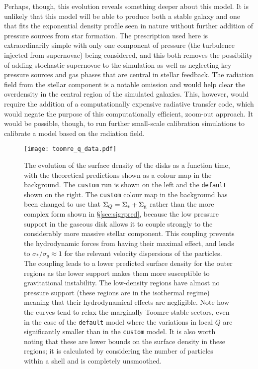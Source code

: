 Perhaps, though, this evolution reveals something deeper about this model.
It is unlikely that this model will be able to produce both a stable galaxy and one that fits the exponential density profile seen in nature without further addition of pressure sources from star formation.
The prescription used here is extraordinarily simple with only one component of pressure (the turbulence injected from supernovae) being considered, and this both removes the possibility of adding stochastic supernovae to the simulation as well as neglecting key pressure sources and gas phases that are central in stellar feedback.
The radiation field from the stellar component is a notable omission and would help clear the overdensity in the central region of the simulated galaxies.
This, however, would require the addition of a computationally expensive radiative transfer code, which would negate the purpose of this computationally efficient, zoom-out approach.
It would be possible, though, to run further small-scale calibration simulations to calibrate a model based on the radiation field.


\begin{figure}
    \centering
    \texttt{[image: toomre\_q\_data.pdf]}
    \caption{The evolution of the surface density of the disks as a function time, with the theoretical predictions shown as a colour map in the background. The {\tt custom} run is shown on the left and the {\tt default} shown on the right. The {\tt custom} colour map in the background has been changed to use that $\Sigma_Q = \Sigma_* + \Sigma_\mathrm{g}$ rather than the more complex form shown in \S \ref{sec:sigrpred}, because the low pressure support in the gaseous disk allows it to couple strongly to the considerably more massive stellar component. This coupling prevents the hydrodynamic forces from having their maximal effect, and leads to $\sigma_*/\sigma_g \approx 1$ for the relevant velocity dispersions of the particles. The coupling leads to a lower predicted surface density for the outer regions as the lower support makes them more susceptible to gravitational instability. The low-density regions have almost no pressure support (these regions are in the isothermal regime) meaning that their hydrodynamical effects are negligible. Note how the curves tend to relax the marginally Toomre-stable sectors, even in the case of the {\tt default} model where the variations in local $Q$ are significantly smaller than in the {\tt custom} model. It is also worth noting that these are lower bounds on the surface density in these regions; it is calculated by considering the number of particles within a shell and is completely unsmoothed.}
    \label{fig:toomreqthr_dat}
\end{figure}

